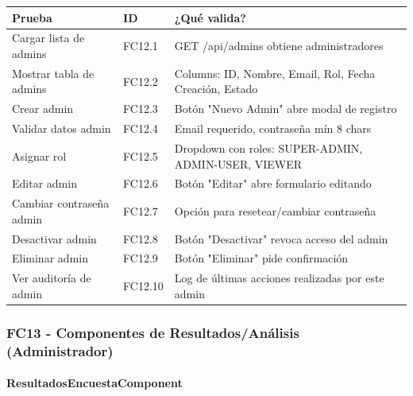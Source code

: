 \begin{table}[H]
\centering
\begin{tabular}{|l|l|p{6cm}|}
\hline
\textbf{Prueba} & \textbf{ID} & \textbf{¿Qué valida?} \\ \hline
Cargar lista de admins & FC12.1 & GET /api/admins obtiene administradores \\ \hline
Mostrar tabla de admins & FC12.2 & Columns: ID, Nombre, Email, Rol, Fecha Creación, Estado \\ \hline
Crear admin & FC12.3 & Botón "Nuevo Admin" abre modal de registro \\ \hline
Validar datos admin & FC12.4 & Email requerido, contraseña mín 8 chars \\ \hline
Asignar rol & FC12.5 & Dropdown con roles: SUPER-ADMIN, ADMIN-USER, VIEWER \\ \hline
Editar admin & FC12.6 & Botón "Editar" abre formulario editando \\ \hline
Cambiar contraseña admin & FC12.7 & Opción para resetear/cambiar contraseña \\ \hline
Desactivar admin & FC12.8 & Botón "Desactivar" revoca acceso del admin \\ \hline
Eliminar admin & FC12.9 & Botón "Eliminar" pide confirmación \\ \hline
Ver auditoría de admin & FC12.10 & Log de últimas acciones realizadas por este admin \\ \hline
\end{tabular}
\end{table}

\subsubsection{FC13 - Componentes de Resultados/Análisis (Administrador)}

\paragraph{ResultadosEncuestaComponent}

